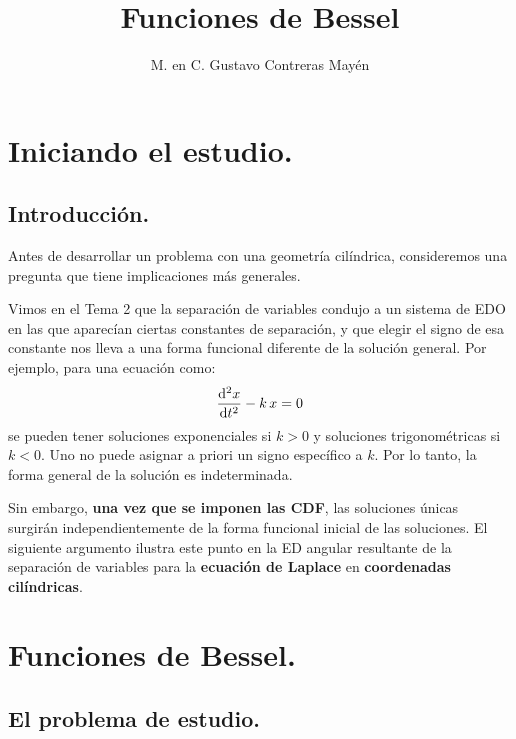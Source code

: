 \documentclass[12pt]{article}
\title{\large{Funciones de Bessel}}
\author{M. en C. Gustavo Contreras Mayén}
\date{}
\numberwithin{equation}{section}
\begin{document}
\maketitle
\fontsize{14}{14}\selectfont
{}
\tableofcontents
\newpage

\section{Iniciando el estudio.}
\subsection{Introducción.}

 
Antes de desarrollar un problema con una geometría cilíndrica, consideremos una pregunta que tiene implicaciones más generales.
\par
Vimos en el Tema 2 que la separación de variables condujo a un sistema de EDO en las que aparecían ciertas constantes de separación, y que elegir el signo de esa constante nos lleva a una forma funcional diferente de la solución general. Por ejemplo, para una ecuación como:
\begin{align*}
\dv[2]{x}{t} - k \, x = 0
\end{align*}
se pueden tener soluciones exponenciales si $k > 0$ y soluciones trigonométricas si $k < 0$.  Uno no puede asignar a priori un signo específico a $k$. Por lo tanto, la forma general de la solución es indeterminada. 
\par
Sin embargo, \textbf{una vez que se imponen las CDF}, las soluciones únicas surgirán independientemente de la forma funcional inicial de las soluciones. El siguiente argumento ilustra este punto en la ED angular resultante de la separación de variables para la \textbf{ecuación de Laplace} en \textbf{coordenadas cilíndricas}.

\section{Funciones de Bessel.}
\subsection{El problema de estudio.}
\end{document}

